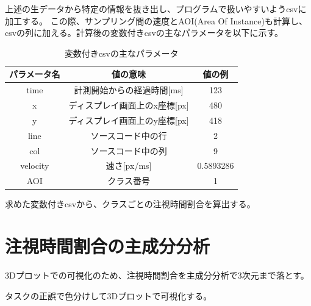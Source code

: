 \documentclass[paper=a4paper,fontsize=11pt]{jlreq}
\begin{document}
  上述の生データから特定の情報を抜き出し、プログラムで扱いやすいようcsvに加工する。
  この際、サンプリング間の速度とAOI(Area Of Instance)も計算し、csvの列に加える。計算後の変数付きcsvの主なパラメータを以下に示す。
  \begin{table}[h]
    \centering
    \caption{変数付きcsvの主なパラメータ}
    \begin{tabular}{|c|c|c|}
        \hline
        パラメータ名 & 値の意味 & 値の例 \\ \hline
        time & 計測開始からの経過時間[ms] & 123 \\ \hline
        x & ディスプレイ画面上のx座標[px] & 480 \\ \hline
        y & ディスプレイ画面上のy座標[px] & 418 \\ \hline
        line & ソースコード中の行 & 2 \\ \hline
        col & ソースコード中の列 & 9 \\ \hline
        velocity & 速さ[px/ms] & 0.5893286\\ \hline
        AOI & クラス番号 & 1\\ \hline
    \end{tabular}
    \label{tab:basic}
  \end{table}
  \FloatBarrier


  求めた変数付きcsvから、クラスごとの注視時間割合を算出する。

  \section{注視時間割合の主成分分析}
  3Dプロットでの可視化のため、注視時間割合を主成分分析で3次元まで落とす。
  
  タスクの正誤で色分けして3Dプロットで可視化する。
  
\end{document}
